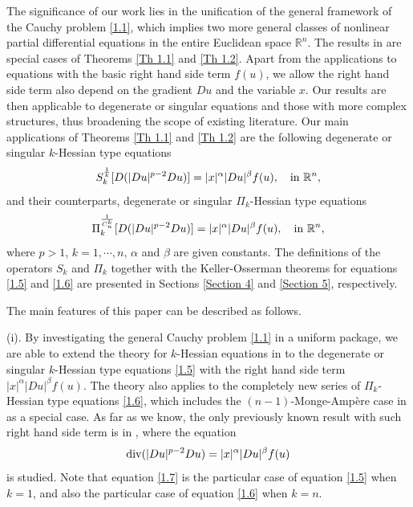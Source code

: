 \documentclass[a4paper,11pt]{amsart}
\theoremstyle{plain}
\theoremstyle{remark}
\numberwithin{equation}{section}
\numberwithin{figure}{section}
\numberwithin{remark}{section}
\begin{document}
\begin{sloppypar}
The significance of our work lies in the unification of the general framework of the Cauchy problem \eqref{1.1}, which implies two more general classes of nonlinear partial differential equations in the entire Euclidean space $\mathbb{R}^n$. 
The results in \cite{K1957, O1957, NU1997, JB2010, BF2022} are special cases of Theorems \ref{Th 1.1} and \ref{Th 1.2}.
Apart from the applications to equations with the basic right hand side term $f(u)$, we allow the right hand side term also depend on the gradient $Du$ and the variable $x$. Our results are then applicable to degenerate or singular equations and those with more complex structures, thus broadening the scope of existing literature. Our main applications of Theorems \ref{Th 1.1} and \ref{Th 1.2} are the following degenerate or singular $k$-Hessian type equations
	\begin{equation}\label{1.5}
	S_k^{\frac{1}{k}} [D(|Du|^{p-2}Du)] = |x|^\alpha |Du|^\beta f(u), \quad {\rm in} \ \mathbb{R}^n,
	\end{equation}
and their counterparts, degenerate or singular $\Pi_k$-Hessian type equations
	\begin{equation}\label{1.6}
	\Pi_k^{\frac{1}{C_n^k}} [D(|Du|^{p-2}Du)] = |x|^\alpha |Du|^\beta f(u), \quad {\rm in} \ \mathbb{R}^n,
	\end{equation}
where $p>1$, $k=1, \cdots, n$, $\alpha$ and $\beta$ are given constants. The definitions of the operators $S_k$ and $\Pi_k$ together with the Keller-Osserman theorems for equations \eqref{1.5} and \eqref{1.6} are presented in Sections \ref{Section 4} and \ref{Section 5}, respectively.

\vspace{2mm}

The main features of this paper can be described as follows.

\vspace{1mm}

(i). By investigating the general Cauchy problem \eqref{1.1} in a uniform package, we are able to extend the theory for $k$-Hessian equations in \cite{K1957, O1957, NU1997, JB2010, BF2022} to the degenerate or singular $k$-Hessian type equations \eqref{1.5} with the right hand side term $|x|^\alpha |Du|^\beta f(u)$. The theory also applies to the completely new series of $\Pi_k$-Hessian type equations \eqref{1.6}, which includes the $(n-1)$-Monge-Amp\`ere case in \cite{JJL2024} as a special case. As far as we know, the only previously known result with such right hand side term is in \cite{FPR2010}, where the equation
\begin{equation}\label{1.7}
{\rm div} (|Du|^{p-2}Du)= |x|^\alpha |Du|^\beta f(u)
\end{equation}
is studied. Note that equation \eqref{1.7} is the particular case of equation \eqref{1.5} when $k=1$, and also the particular case of equation \eqref{1.6} when $k=n$. 


\end{sloppypar}
\end{document}

